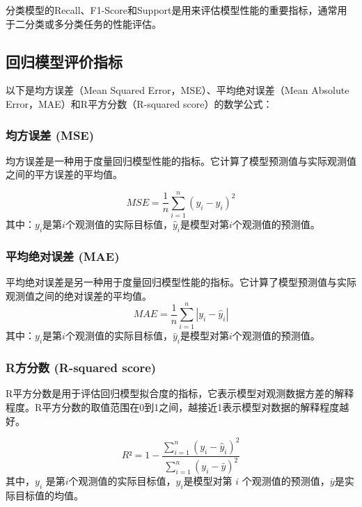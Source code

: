 \documentclass[UTF8,12pt]{ctexart}
\begin{document}
	
	分类模型的Recall、F1-Score和Support是用来评估模型性能的重要指标，通常用于二分类或多分类任务的性能评估。
	
	

	
	\subsection{回归模型评价指标}
	
	以下是均方误差（Mean Squared Error，MSE）、平均绝对误差（Mean Absolute Error，MAE）和R平方分数（R-squared score）的数学公式：
	
	\subsubsection{均方误差 (MSE)}
	
	均方误差是一种用于度量回归模型性能的指标。它计算了模型预测值与实际观测值之间的平方误差的平均值。
	
	\begin{equation}
		MSE = \dfrac{1}{n} \sum_{i=1}^{n} (y_i - \hat{y}_i)^2
	\end{equation}
	其中：$y_i$是第$i$个观测值的实际目标值，$\hat{y}_i$是模型对第$i$个观测值的预测值。
	
	\subsubsection{平均绝对误差 (MAE)}
	
	平均绝对误差是另一种用于度量回归模型性能的指标。它计算了模型预测值与实际观测值之间的绝对误差的平均值。
	\begin{equation}
		MAE = \dfrac{1}{n} \sum_{i=1}^{n} |y_i - \hat{y}_i|
	\end{equation}
	其中：$y_i$是第$i$个观测值的实际目标值，$\hat{y}_i$是模型对第$i$个观测值的预测值。
	
	\subsubsection{R方分数 (R-squared score)}
	R平方分数是用于评估回归模型拟合度的指标，它表示模型对观测数据方差的解释程度。R平方分数的取值范围在0到1之间，越接近1表示模型对数据的解释程度越好。
	
	\begin{equation}
		R² = 1 - \dfrac{\sum_{i=1}^{n} (y_i - \hat{y}_i)^2}{\sum_{i=1}^{n} (y_i - \bar{y})^2}
	\end{equation}
	其中，$y_i$ 是第$i$个观测值的实际目标值，$\hat{y}_i$是模型对第 $i$ 个观测值的预测值，$\bar{y}$是实际目标值的均值。
	
\end{document}
